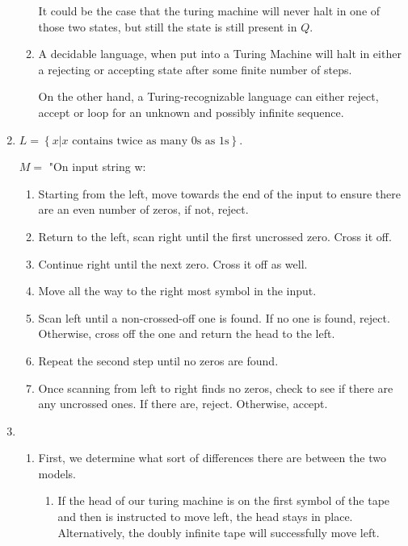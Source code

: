 \documentclass{article}
\newcommand{\set}[1]{{\left\{#1\right\}}}    %
\begin{document}
\begin{enumerate}
\begin{enumerate}
                It could be the case that the turing machine will never halt in one of those two states, but still the state is still present in $Q$.
            \item
                A decidable language, when put into a Turing Machine will halt in either a rejecting or accepting state after some finite number of steps.

                On the other hand, a Turing-recognizable language can either reject, accept or loop for an unknown and possibly infinite sequence.
        \end{enumerate}
    \item %
        $L = \set{x | x \text{ contains twice as many 0s as 1s}}$.

        $M = $ "On input string w:

        \begin{enumerate}
            \item
                Starting from the left, move towards the end of the input to ensure there are an even number of zeros, if not, reject.
            \item
                Return to the left, scan right until the first uncrossed zero. Cross it off.
            \item
                Continue right until the next zero. Cross it off as well.
            \item
                Move all the way to the right most symbol in the input.
            \item
                Scan left until a non-crossed-off one is found. If no one is found, reject.
                Otherwise, cross off the one and return the head to the left.
            \item
                Repeat the second step until no zeros are found.
            \item
                Once scanning from left to right finds no zeros, check to see if there are any uncrossed ones.
                If there are, reject. Otherwise, accept.
        \end{enumerate}
    \item %
        \begin{enumerate}
            \item
                First, we determine what sort of differences there are between the two models.

                \begin{enumerate}
                    \item
                        If the head of our turing machine is on the first symbol of the tape and then is instructed to move left, the head stays in place.
                        Alternatively, the doubly infinite tape will successfully move left.
                \end{enumerate}


\end{enumerate}
\end{enumerate}
\end{document}

